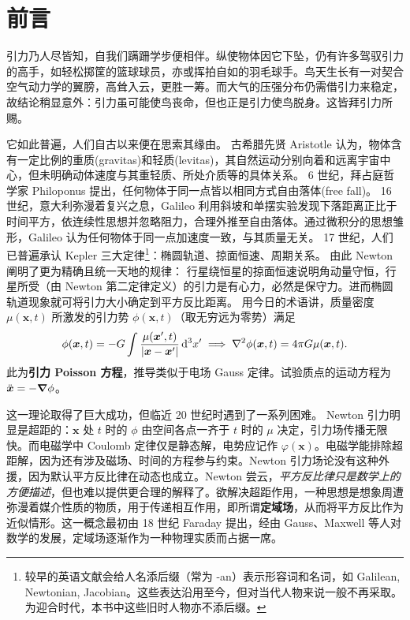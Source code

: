 \chapter*{前言}

引力乃人尽皆知，自我们蹒跚学步便相伴。纵使物体因它下坠，仍有许多驾驭引力的高手，如轻松掷筐的篮球球员，亦或挥拍自如的羽毛球手。鸟天生长有一对契合空气动力学的翼膀，高耸入云，更胜一筹。而大气的压强分布仍需借引力来稳定，故结论稍显意外：引力虽可能使鸟丧命，但也正是引力使鸟脱身。这皆拜引力所赐。

它如此普遍，人们自古以来便在思索其缘由。
古希腊先贤 Aristotle 认为，物体含有一定比例的重质(gravitas)和轻质(levitas)，其自然运动分别向着和远离宇宙中心，但未明确动体速度与其重轻质、所处介质等的具体关系。
6 世纪，拜占庭哲学家 Philoponus 提出，任何物体于同一点皆以相同方式自由落体(free fall)。
16 世纪，意大利弥漫着复兴之息，Galileo 利用斜坡和单摆实验发现下落距离正比于时间平方，依连续性思想并忽略阻力，合理外推至自由落体。通过微积分的思想雏形，Galileo 认为任何物体于同一点加速度一致，与其质量无关。
17 世纪，人们已普遍承认 Kepler 三大定律\footnote{较早的英语文献会给人名添后缀（常为 -an）表示形容词和名词，如 Galilean, Newtonian, Jacobian。这些表达沿用至今，但对当代人物来说一般不再采取。为迎合时代，本书中这些旧时人物亦不添后缀。}：椭圆轨道、掠面恒速、周期关系。
由此 Newton 阐明了更为精确且统一天地的规律：
行星绕恒星的掠面恒速说明角动量守恒，行星所受（由 Newton 第二定律定义）的引力是有心力，必然是保守力。进而椭圆轨道现象就可将引力大小确定到平方反比距离。
用今日的术语讲，质量密度 $\mu(\bm x,t)$ 所激发的引力势 $\phi(\bm x,t)$（取无穷远为零势）满足
\[\phi(\vb* x,t)=-G\int\frac{\mu(\vb* x',t)}{|\vb* x-\vb* x'|}\,\dd[3]x'\implies \nabla^2\phi(\vb* x,t)=4\pi G \mu(\vb* x,t).\]
此为\textbf{引力 Poisson 方程}，推导类似于电场 Gauss 定律。试验质点的运动方程为 $\ddot{\vb* x}=-\grad\phi$。

这一理论取得了巨大成功，但临近 20 世纪时遇到了一系列困难。
Newton 引力明显是超距的：$\bm x$ 处 $t$ 时的 $\phi$ 由空间各点一齐于 $t$ 时的 $\mu$ 决定，引力场传播无限快。而电磁学中 Coulomb 定律仅是静态解，电势应记作 $\varphi(\bm x)$。电磁学能排除超距解，因为还有涉及磁场、时间的方程参与约束。Newton 引力场论没有这种外援，因为默认平方反比律在动态也成立。Newton 尝云，\textit{平方反比律只是数学上的方便描述}，但也难以提供更合理的解释了。欲解决超距作用，一种思想是想象周遭弥漫着媒介性质的物质，用于传递相互作用，即所谓\textbf{定域场}，从而将平方反比作为近似情形。这一概念最初由 18 世纪 Faraday 提出，经由 Gauss、Maxwell 等人对数学的发展，定域场逐渐作为一种物理实质而占据一席。

